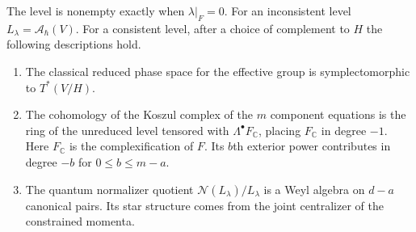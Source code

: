 \documentclass[11pt,letterpaper]{article}
\newcommand{\cA}{\mathcal A}
\newcommand{\cN}{\mathcal N}
\newcommand{\CC}{\mathbb C}
\begin{document}
\begin{theorem}\label{thm:linear}
The level is nonempty exactly when $\lambda|_F=0$. For an inconsistent level
$L_\lambda=\cA_\hbar(V)$. For a consistent level, after a choice of complement to $H$ the
following descriptions hold.
\begin{enumerate}
\item The classical reduced phase space for the effective group is symplectomorphic to $T^*(V/H)$.
\item The cohomology of the Koszul complex of the $m$ component equations is the ring of the unreduced level tensored with $\Lambda^\bullet F_{\CC}$, placing $F_{\CC}$ in degree $-1$. Here $F_{\CC}$ is the complexification of $F$. Its $b$th exterior power contributes in degree $-b$ for $0\le b\le m-a$.
\item The quantum normalizer quotient $\cN(L_\lambda)/L_\lambda$ is a Weyl algebra on $d-a$ canonical pairs. Its star structure comes from the joint centralizer of the constrained momenta.
\end{enumerate}
\end{theorem}
\end{document}

